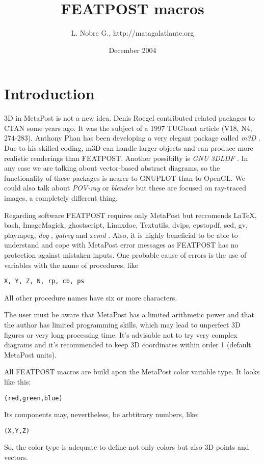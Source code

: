 \documentclass[a4paper]{article}
\title{FEATPOST macros}
\author{L. Nobre G., {\ttfamily http://matagalatlante.org}}
\date{December 2004}
\begin{document}
\maketitle

\section{Introduction}

3D in MetaPost is not a new idea. Denis Roegel
contributed related packages to CTAN some years ago. It was the
subject of a 1997 TUGboat article (V18, N4, 274-283). Anthony 
Phan has been developing a very elegant package 
called 
{\em m3D} {\tt \aaaurl}
. Due to his skilled coding, {\ttfamily m3D} can
handle larger objects and can produce more realistic renderings than
{\ttfamily FEATPOST}. Another possibilty is 
{\em GNU 3DLDF} {\tt \aaburl}
.
In any case we are talking about vector-based abstract diagrams, 
so the functionality of
these packages is nearer to {\ttfamily GNUPLOT} than to {\ttfamily OpenGL}.
We could also talk about {\ttfamily 
{\em POV-ray} {\tt \aacurl}
} or 
{\ttfamily 
{\em blender} {\tt \aadurl}
} but these
are focused on ray-traced images, a completely different thing.

Regarding software {\ttfamily FEATPOST} requires only MetaPost but
reccomends {\ttfamily LaTeX, bash, ImageMagick, ghostscript,
Linuxdoc, Textutils, dvips, epstopdf, sed, gv, plaympeg, 
{\em dog} {\tt \aaeurl}
, 
{\em galrey} {\tt \aafurl}
} and {\ttfamily 
{\em xcmd} {\tt \aagurl}
}. Also, it is highly beneficial to
be able to understand and cope with MetaPost error messages as
{\ttfamily FEATPOST} has no protection against mistaken inputs. One
probable cause of errors is the use of variables with the name of
procedures, like 
\begin{tscreen}
\begin{verbatim}
X, Y, Z, N, rp, cb, ps
\end{verbatim}
\end{tscreen}
All other procedure names have six or more characters. 

The user must be aware that MetaPost has a limited arithmetic power
and that the author has limited programming skills,
which may lead to unperfect 3D figures or very long processing time.
It's advisable not to try very complex diagrams and it's recommended to
keep 3D coordinates within order 1 (default MetaPost units).

All {\ttfamily FEATPOST} macros are build apon the MetaPost
{\ttfamily color} variable type. It looks like this:
\begin{tscreen}
\begin{verbatim}
(red,green,blue)
\end{verbatim}
\end{tscreen}
Its components may, nevertheless, 
be arbtitrary numbers, like:
\begin{tscreen}
\begin{verbatim}
(X,Y,Z)
\end{verbatim}
\end{tscreen}
So, the 
{\ttfamily color} type is adequate to define not only colors but
also 3D points and vectors.  
\end{document}
